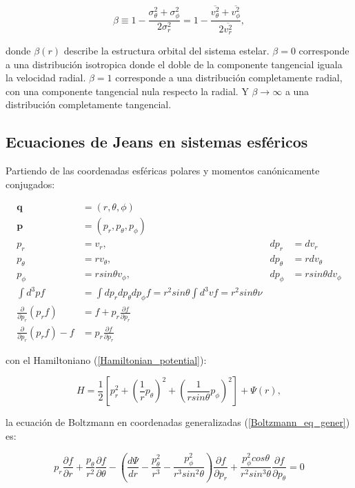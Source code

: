 \begin{equation}
\label{Vel_anisotropy}
\beta \equiv 1- \frac{\sigma_\theta^2 + \sigma_\phi^2}{2 \sigma_r^2} = 1- \frac{\overline{v_\theta^2} + \overline{v_\phi^2}}{2 \overline{v_r^2}}, 
\end{equation}

donde $\beta (r)$ describe la estructura orbital del sistema estelar. $\beta = 0$ corresponde a una distribución isotropica donde el doble de la componente tangencial iguala la velocidad radial. $\beta = 1$ corresponde a una distribución completamente radial, con una componente tangencial nula respecto la radial. Y $\beta \rightarrow \infty$ a una distribución completamente tangencial.

\subsection{Ecuaciones de Jeans en sistemas esféricos}

Partiendo de las coordenadas esféricas polares y momentos canónicamente conjugados:

\begin{align*}
\textbf{q} &= (r, \theta, \phi) \\
\textbf{p} &= (p_r, p_\theta, p_\phi) \\
p_r &= v_r,  & d p_r &= d v_r \\
p_\theta &= r v_\theta,  & d p_\theta &= r d v_\theta \\
p_\phi &= r sin \theta v_\phi,  & d p_\phi &= r sin \theta d v_\phi \\
\int d^3 p f &= \int d p_r d p_\theta d p_\phi f = r^2 sin \theta \int d^3 v  f = r^2 sin \theta \nu \\
\frac{\partial }{ \partial p_r} (p_r f) &= f + p_r \frac{\partial f}{\partial p_r} \\
\frac{\partial }{\partial p_r} (p_r f) - f &= p_r \frac{\partial f}{\partial p_r}
\end{align*}


con el Hamiltoniano (\ref{Hamiltonian_potential}):

\begin{equation}
H = \frac{1}{2} \left [ p_r^2 + \left ( \frac{1}{r} p_\theta  \right )^2 + \left ( \frac{1}{r sin \theta} p_\phi  \right )^2 \right ] + \Psi (r),
\end{equation}

la ecuación de Boltzmann en coordenadas generalizadas (\ref{Boltzmann_eq_gener}) es:

\begin{equation}
p_r \frac{\partial f}{\partial r} + \frac{p_\theta}{r^2} \frac{\partial f}{\partial \theta} - \left ( \frac{d \Psi}{d r}  - \frac{p_\theta^2}{r^3} - \frac{p_\phi^2}{r^3 sin^2\theta} \right ) \frac{\partial f}{\partial p_r} + \frac{p_\phi^2 cos \theta}{r^2 sin^3\theta} \frac{\partial f}{\partial p_\theta} = 0
\end{equation}

